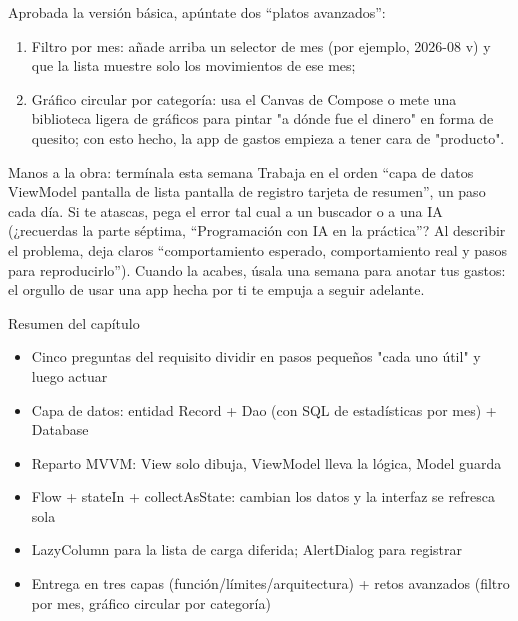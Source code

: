 Aprobada la versión básica, apúntate dos “platos avanzados”:

\begin{enumerate}
  \item Filtro por mes: añade arriba un selector de mes (por ejemplo, 2026-08 v) y que la lista muestre solo los movimientos de ese mes;
  \item Gráfico circular por categoría: usa el Canvas de Compose o mete una biblioteca ligera de gráficos para pintar "a dónde fue el dinero" en forma de quesito; con esto hecho, la app de gastos empieza a tener cara de "producto".
\end{enumerate}

\begin{tcbpractice}{Manos a la obra: termínala esta semana}
Trabaja en el orden “capa de datos ViewModel pantalla de lista pantalla de registro tarjeta de resumen”, un paso cada día. Si te atascas, pega el error tal cual a un buscador o a una IA (¿recuerdas la parte séptima, “Programación con IA en la práctica”? Al describir el problema, deja claros “comportamiento esperado, comportamiento real y pasos para reproducirlo”). Cuando la acabes, úsala una semana para anotar tus gastos: el orgullo de usar una app hecha por ti te empuja a seguir adelante.

\end{tcbpractice}

\begin{tcbsummary}{Resumen del capítulo}
\begin{itemize}
  \item Cinco preguntas del requisito dividir en pasos pequeños "cada uno útil" y luego actuar
  \item Capa de datos: entidad Record + Dao (con SQL de estadísticas por mes) + Database
  \item Reparto MVVM: View solo dibuja, ViewModel lleva la lógica, Model guarda
  \item Flow + stateIn + collectAsState: cambian los datos y la interfaz se refresca sola
  \item LazyColumn para la lista de carga diferida; AlertDialog para registrar
  \item Entrega en tres capas (función/límites/arquitectura) + retos avanzados (filtro por mes, gráfico circular por categoría)
\end{itemize}

\end{tcbsummary}
